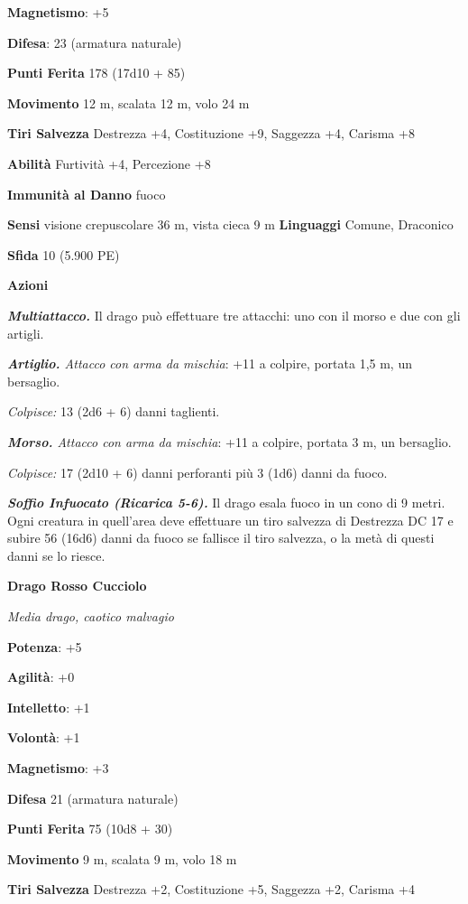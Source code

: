 \begin{multicols}{2}
\textbf{Magnetismo}: +5

\textbf{Difesa}: 23 (armatura naturale)

\textbf{Punti Ferita} 178 (17d10 + 85)

\textbf{Movimento} 12 m, scalata 12 m, volo 24 m

\textbf{Tiri Salvezza} Destrezza +4, Costituzione +9, Saggezza +4,
Carisma +8

\textbf{Abilità} Furtività +4, Percezione +8

\textbf{Immunità al Danno} fuoco

\textbf{Sensi} visione crepuscolare 36 m, vista cieca 9 m
\textbf{Linguaggi} Comune, Draconico

\textbf{Sfida} 10 (5.900 PE)

\textbf{Azioni}

\emph{\textbf{Multiattacco.}} Il drago può effettuare tre attacchi: uno
con il morso e due con gli artigli.

\emph{\textbf{Artiglio.} Attacco con arma da mischia}: +11 a colpire,
portata 1,5 m, un bersaglio.

\emph{Colpisce:} 13 (2d6 + 6) danni taglienti.

\emph{\textbf{Morso.} Attacco con arma da mischia}: +11 a colpire,
portata 3 m, un bersaglio.

\emph{Colpisce:} 17 (2d10 + 6) danni perforanti più 3 (1d6) danni da
fuoco.

\emph{\textbf{Soffio Infuocato (Ricarica 5-6).}} Il drago esala fuoco in
un cono di 9 metri. Ogni creatura in quell'area deve effettuare un tiro
salvezza di Destrezza DC 17 e subire 56 (16d6) danni da fuoco se
fallisce il tiro salvezza, o la metà di questi danni se lo riesce.

\textbf{Drago Rosso Cucciolo}

\emph{Media drago, caotico malvagio}

\textbf{Potenza}: +5

\textbf{Agilità}: +0

\textbf{Intelletto}: +1

\textbf{Volontà}: +1

\textbf{Magnetismo}: +3

\textbf{Difesa} 21 (armatura naturale)

\textbf{Punti Ferita} 75 (10d8 + 30)

\textbf{Movimento} 9 m, scalata 9 m, volo 18 m

\textbf{Tiri Salvezza} Destrezza +2, Costituzione +5, Saggezza +2,
Carisma +4


\end{multicols}
